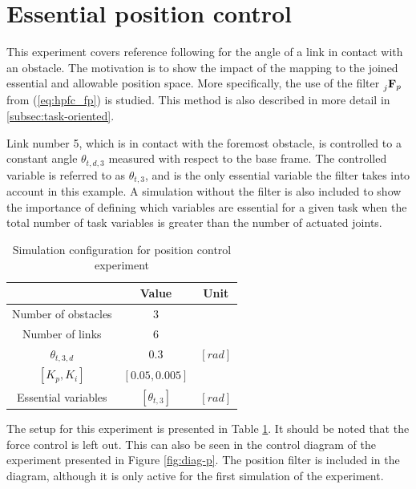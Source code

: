 \section{Essential position control}\label{sec:ess-pos}

This experiment covers reference following for the angle of a link in contact with an obstacle. The motivation is to show the impact of the mapping to the joined essential and allowable position space. More specifically, the use of the filter $\prescript{}{j}{\mathbf{F}}_{p}$ from (\ref{eq:hpfc_fp}) is studied. This method is also described in more detail in \ref{subsec:task-oriented}.

Link number 5, which is in contact with the foremost obstacle, is controlled to a constant angle $\theta_{t,d,3}$ measured with respect to the base frame. The controlled variable is referred to as $\theta_{t,3}$, and is the only essential variable the filter takes into account in this example. A simulation without the filter is also included to show the importance of defining which variables are essential for a given task when the total number of task variables is greater than the number of actuated joints.

\begin{table}[h!]
    \centering
    \begin{tabular}{|c|c|c|}
        \hline
        & \textbf{Value} & \textbf{Unit}\\
        \hline \hline
        Number of obstacles & $3$ & \\
        Number of links & $6$ & \\
        $\theta_{t,3,d}$ & $0.3$ & $[rad]$ \\
        $[K_p, K_i]$ & $[0.05, 0.005]$ &\\
        Essential variables & $[\theta_{t,3}]$ & $[rad]$ \\
        \hline
    \end{tabular}
    \caption{Simulation configuration for position control experiment}
    \label{tab:exp_single_pos}
\end{table}

The setup for this experiment is presented in Table \ref{tab:exp_single_pos}. It should be noted that the force control is left out. This can also be seen in the control diagram of the experiment presented in Figure \ref{fig:diag-p}. The position filter is included in the diagram, although it is only active for the first simulation of the experiment.

